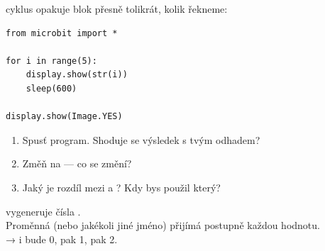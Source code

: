 \begin{ukol}

 cyklus opakuje blok přesně tolikrát, kolik řekneme:

\begin{lstlisting}
from microbit import *

for i in range(5):
    display.show(str(i))
    sleep(600)

display.show(Image.YES)
\end{lstlisting}


\begin{enumerate}
  \item Spusť program. Shoduje se výsledek s tvým odhadem?
  \item Změň  na  — co se změní?
  \item Jaký je rozdíl mezi  a ?
        Kdy bys použil který?
\end{enumerate}

\odpoved[2.5cm]

\begin{tcolorbox}[colback=code-bg, colframe=gray!40,
                  fonttitle=\small\bfseries, title=range() a proměnná i]
  \small
   vygeneruje čísla .\\
  Proměnná  (nebo jakékoli jiné jméno) přijímá postupně každou hodnotu.\\
   → i bude 0, pak 1, pak 2.
\end{tcolorbox}

\end{ukol}


